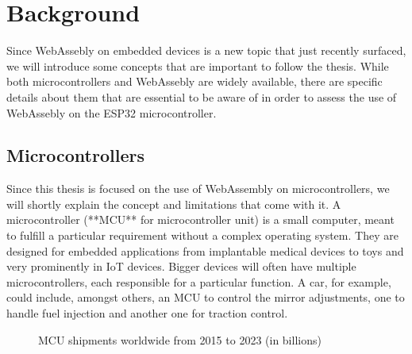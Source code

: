 
\chapter{Background}\label{chapter:background}

Since WebAssebly on embedded devices is a new topic that just recently surfaced, we will introduce some concepts that are important to follow the thesis. While both microcontrollers and WebAssebly are widely available, there are specific details about them that are essential to be aware of in order to assess the use of WebAssebly on the ESP32 microcontroller.

\section{Microcontrollers}
Since this thesis is focused on the use of WebAssembly on microcontrollers, we will shortly explain the concept and limitations that come with it. A microcontroller (**MCU** for microcontroller unit) is a small computer, meant to fulfill a particular requirement without a complex operating system. They are designed for embedded applications from implantable medical devices to toys and very prominently in IoT devices. Bigger devices will often have multiple microcontrollers, each responsible for a particular function. A car, for example, could include, amongst others, an MCU to control the mirror adjustments, one to handle fuel injection and another one for traction control.

\begin{figure}[h]
    \caption{MCU shipments worldwide from 2015 to 2023 (in billions)}
\end{figure}

